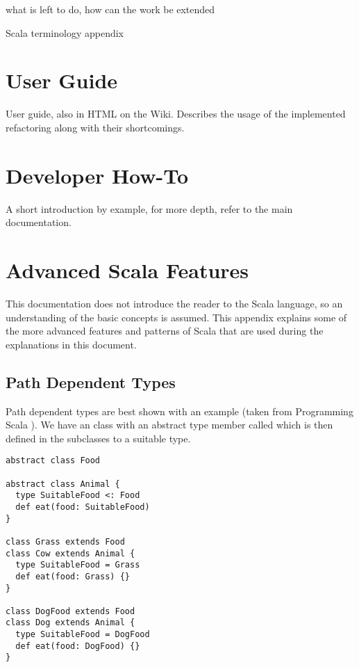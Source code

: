 \documentclass[10pt,a4paper,oneside]{scrreprt}
\begin{document}
what is left to do, how can the work be extended

\appendix

Scala terminology appendix

\chapter{User Guide}

User guide, also in HTML on the Wiki. Describes the usage of the implemented refactoring along with their shortcomings.

\chapter{Developer How-To}

A short introduction by example, for more depth, refer to the main documentation.



\chapter{Advanced Scala Features}

This documentation does not introduce the reader to the Scala language, so an understanding of the basic concepts is assumed. This appendix explains some of the more advanced features and patterns of Scala that are used during the explanations in this document.

\section{Path Dependent Types} \label{section:path-dependent-types}

Path dependent types are best shown with an example (taken from Programming Scala \cite{ProgrammingScala}). We have an  class with an abstract type member called  which is then defined in the subclasses to a suitable type.
\begin{lstlisting}
abstract class Food

abstract class Animal {
  type SuitableFood <: Food
  def eat(food: SuitableFood)
}

class Grass extends Food
class Cow extends Animal {
  type SuitableFood = Grass
  def eat(food: Grass) {}
}

class DogFood extends Food
class Dog extends Animal {
  type SuitableFood = DogFood
  def eat(food: DogFood) {}
}
\end{lstlisting}
\end{document}
